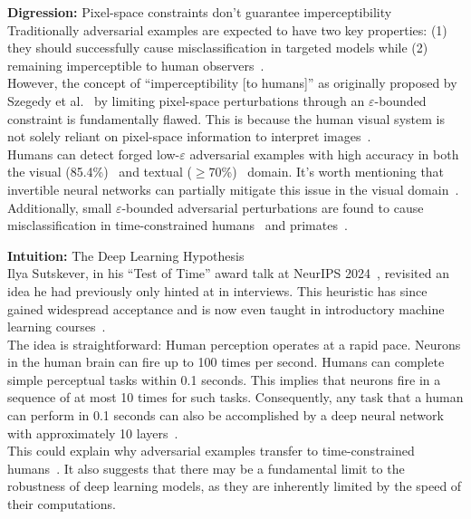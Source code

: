 \documentclass[a4paper, oneside]{discothesis}
\begin{document}
\begin{highlightbox}
	\textbf{Digression:} Pixel-space constraints don't guarantee imperceptibility \\

	Traditionally adversarial examples are expected to have two key properties: (1) they should successfully cause misclassification in targeted models while (2) remaining imperceptible to human observers~\cite{cubuk2017intriguing}. \\

	However, the concept of ``imperceptibility [to humans]'' as originally proposed by Szegedy et al.~\cite{szegedy2013intriguing} by limiting pixel-space perturbations through an $\varepsilon$-bounded constraint is fundamentally flawed. This is because the human visual system is not solely reliant on pixel-space information to interpret images~\cite{ning2023hflic}. \\

	Humans can detect forged low-$\varepsilon$ adversarial examples with high accuracy in both the visual (85.4\%)~\cite{veerabadran2023subtle} and textual ($\geq$70\%)~\cite{herel2023preserving} domain. It's worth mentioning that invertible neural networks can partially mitigate this issue in the visual domain~\cite{chen2023imperceptible}. \\
	
	Additionally, small $\varepsilon$-bounded adversarial perturbations are found to cause misclassification in time-constrained humans~\cite{elsayed2018adversarial} and primates~\cite{yuan2020fooling}.
\end{highlightbox}

\begin{highlightbox}
	\textbf{Intuition:} The Deep Learning Hypothesis \\

	Ilya Sutskever, in his ``Test of Time'' award talk at NeurIPS 2024~\cite{sutskever2014sequence}, revisited an idea he had previously only hinted at in interviews. This heuristic has since gained widespread acceptance and is now even taught in introductory machine learning courses~\cite{guerzhoy_ann}. \\
	
	The idea is straightforward: Human perception operates at a rapid pace. Neurons in the human brain can fire up to 100 times per second. Humans can complete simple perceptual tasks within 0.1 seconds. This implies that neurons fire in a sequence of at most 10 times for such tasks. Consequently, any task that a human can perform in 0.1 seconds can also be accomplished by a deep neural network with approximately 10 layers~\cite{sutskever2014sequence}. \\

	This could explain why adversarial examples transfer to time-constrained humans~\cite{elsayed2018adversarial}. It also suggests that there may be a fundamental limit to the robustness of deep learning models, as they are inherently limited by the speed of their computations.
\end{highlightbox}
\end{document}
